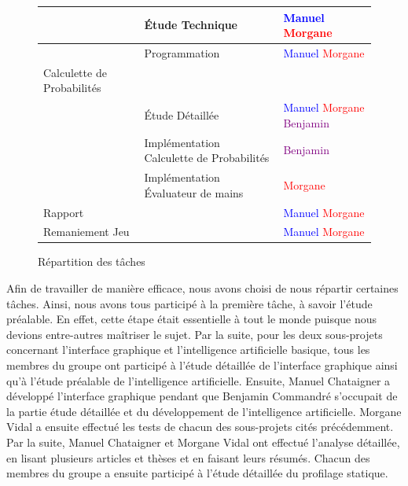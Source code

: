 \documentclass{report}
\begin{document}
\begin{figure}[h]
\begin{tabular}{|l|l|l|}
  				 \hline
  				 & Étude Technique & \textcolor{blue}{Manuel}  \textcolor{red}{Morgane} \\
  				 \hline
  				 & Programmation & \textcolor{blue}{Manuel}  \textcolor{red}{Morgane} \\
  				 \hline
  				 Calculette de Probabilités & & \\
  				 \hline
  				 & Étude Détaillée & \textcolor{blue}{Manuel}  \textcolor{red}{Morgane} \textcolor{purple}{Benjamin}\\
  				 \hline
  				 & Implémentation Calculette de Probabilités & \textcolor{purple}{Benjamin}\\
  				 \hline
  				 & Implémentation Évaluateur de mains & \textcolor{red}{Morgane} \\
  				 \hline
  				 Rapport & & \textcolor{blue}{Manuel}  \textcolor{red}{Morgane} \\
  				 \hline
  				 Remaniement Jeu & & \textcolor{blue}{Manuel}  \textcolor{red}{Morgane} \\
   				\hline
			\end{tabular}	
			\caption{Répartition des tâches}
		\end{figure}
		\medskip

\hspace{0.5cm}Afin de travailler de manière efficace, nous avons choisi de nous répartir certaines tâches. Ainsi, nous avons tous participé à la première tâche, à savoir l'étude préalable. En effet, cette étape était essentielle à tout le monde puisque nous devions entre-autres maîtriser le sujet. Par la suite, pour les deux sous-projets concernant l'interface graphique et l'intelligence artificielle basique, tous les membres du groupe ont participé à l'étude détaillée de l'interface graphique ainsi qu'à l'étude préalable de l'intelligence artificielle. Ensuite, Manuel Chataigner a développé l'interface graphique pendant que Benjamin Commandré s'occupait de la partie étude détaillée et du développement de l'intelligence artificielle. Morgane Vidal a ensuite effectué les tests de chacun des sous-projets cités précédemment. Par la suite, Manuel Chataigner et Morgane Vidal ont effectué l'analyse détaillée, en lisant plusieurs articles et thèses et en faisant leurs résumés. Chacun des membres du groupe a ensuite participé à l'étude détaillée du profilage statique. \\
\end{document}
